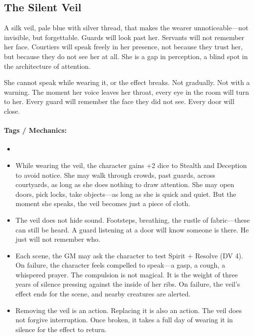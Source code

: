 \subsection*{The Silent Veil}

A silk veil, pale blue with silver thread, that makes the wearer unnoticeable---not invisible, but forgettable. Guards will look past her. Servants will not remember her face. Courtiers will speak freely in her presence, not because they trust her, but because they do not see her at all. She is a gap in perception, a blind spot in the architecture of attention.

She cannot speak while wearing it, or the effect breaks. Not gradually. Not with a warning. The moment her voice leaves her throat, every eye in the room will turn to her. Every guard will remember the face they did not see. Every door will close.

\paragraph{Tags / Mechanics:}
\begin{itemize}
\item [STEALTH] [CURSE] [SILENCE]
\item While wearing the veil, the character gains +2 dice to Stealth and Deception to avoid notice. She may walk through crowds, past guards, across courtyards, as long as she does nothing to draw attention. She may open doors, pick locks, take objects---as long as she is quick and quiet. But the moment she speaks, the veil becomes just a piece of cloth.
\item The veil does not hide sound. Footsteps, breathing, the rustle of fabric---these can still be heard. A guard listening at a door will know someone is there. He just will not remember who.
\item Each scene, the GM may ask the character to test Spirit + Resolve (DV 4). On failure, the character feels compelled to speak---a gasp, a cough, a whispered prayer. The compulsion is not magical. It is the weight of three years of silence pressing against the inside of her ribs. On failure, the veil's effect ends for the scene, and nearby creatures are alerted.
\item Removing the veil is an action. Replacing it is also an action. The veil does not forgive interruption. Once broken, it takes a full day of wearing it in silence for the effect to return.
\end{itemize}

